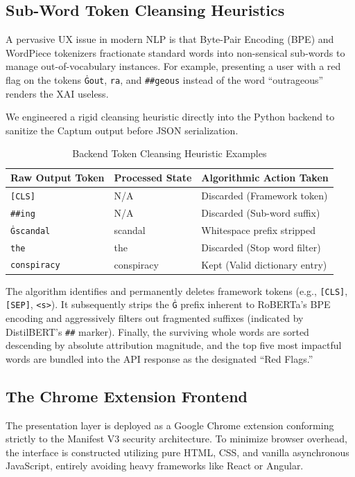 \documentclass[conference]{IEEEtran}
\begin{document}
\subsection{Sub-Word Token Cleansing Heuristics}
A pervasive UX issue in modern NLP is that Byte-Pair Encoding (BPE) and WordPiece tokenizers fractionate standard words into non-sensical sub-words to manage out-of-vocabulary instances. For example, presenting a user with a red flag on the tokens \texttt{Ġout}, \texttt{ra}, and \texttt{\#\#geous} instead of the word ``outrageous'' renders the XAI useless.

We engineered a rigid cleansing heuristic directly into the Python backend to sanitize the Captum output before JSON serialization. 

\begin{table}[h]
\centering
\caption{Backend Token Cleansing Heuristic Examples}
\begin{tabular}{@{}llp{3.5cm}@{}}
\toprule
\textbf{Raw Output Token} & \textbf{Processed State} & \textbf{Algorithmic Action Taken} \\ \midrule
\texttt{[CLS]}     & N/A                & Discarded (Framework token) \\
\texttt{\#\#ing}   & N/A                & Discarded (Sub-word suffix) \\
\texttt{Ġscandal}  & scandal            & Whitespace prefix stripped \\
\texttt{the}       & the                & Discarded (Stop word filter) \\
\texttt{conspiracy}& conspiracy         & Kept (Valid dictionary entry) \\ \bottomrule
\end{tabular}
\label{tab:tokens}
\end{table}

The algorithm identifies and permanently deletes framework tokens (e.g., \texttt{[CLS]}, \texttt{[SEP]}, \texttt{<s>}). It subsequently strips the \texttt{Ġ} prefix inherent to RoBERTa's BPE encoding and aggressively filters out fragmented suffixes (indicated by DistilBERT's \texttt{\#\#} marker). Finally, the surviving whole words are sorted descending by absolute attribution magnitude, and the top five most impactful words are bundled into the API response as the designated ``Red Flags.''

\subsection{The Chrome Extension Frontend}
The presentation layer is deployed as a Google Chrome extension conforming strictly to the Manifest V3 security architecture. To minimize browser overhead, the interface is constructed utilizing pure HTML, CSS, and vanilla asynchronous JavaScript, entirely avoiding heavy frameworks like React or Angular.
\end{document}
